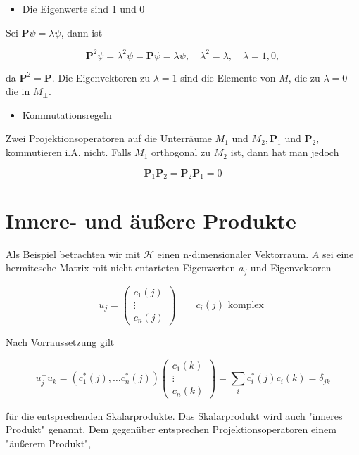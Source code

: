 \documentclass[10pt, letterpaper]{article}
\begin{document}
\begin{itemize}
  \item Die Eigenwerte sind 1 und 0
\end{itemize}

Sei $\mathbf{P} \psi=\lambda \psi$, dann ist

$$
\mathbf{P}^{2} \psi=\lambda^{2} \psi=\mathbf{P} \psi=\lambda \psi, \quad \lambda^{2}=\lambda, \quad \lambda=1,0,
$$

da $\mathbf{P}^{2}=\mathbf{P}$. Die Eigenvektoren zu $\lambda=1$ sind die Elemente von $M$, die zu $\lambda=0$ die in $M_{\perp}$.

\begin{itemize}
  \item Kommutationsregeln
\end{itemize}

Zwei Projektionsoperatoren auf die Unterräume $M_{1}$ und $M_{2}, \mathbf{P}_{1}$ und $\mathbf{P}_{2}$, kommutieren i.A. nicht. Falls $M_{1}$ orthogonal zu $M_{2}$ ist, dann hat man jedoch

$$
\mathbf{P}_{1} \mathbf{P}_{2}=\mathbf{P}_{2} \mathbf{P}_{1}=0
$$

\section*{Innere- und äußere Produkte}
Als Beispiel betrachten wir mit $\mathcal{H}$ einen n-dimensionaler Vektorraum. $A$ sei eine hermitesche Matrix mit nicht entarteten Eigenwerten $a_{j}$ und Eigenvektoren

$$
u_{j}=\left(\begin{array}{c}
c_{1}(j) \\
\vdots \\
c_{n}(j)
\end{array}\right) \quad \quad c_{i}(j) \text { komplex }
$$

Nach Vorraussetzung gilt

$$
u_{j}^{+} u_{k}=\left(c_{1}^{*}(j), \ldots c_{n}^{*}(j)\right)\left(\begin{array}{c}
c_{1}(k) \\
\vdots \\
c_{n}(k)
\end{array}\right)=\sum_{i} c_{i}^{*}(j) c_{i}(k)=\delta_{j k}
$$

für die entsprechenden Skalarprodukte. Das Skalarprodukt wird auch "inneres Produkt" genannt. Dem gegenüber entsprechen Projektionsoperatoren einem "äußerem Produkt",
\end{document}
